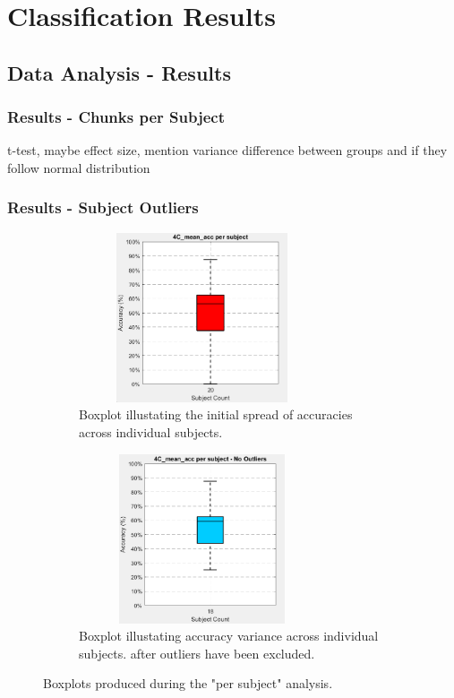 \pagebreak
\chapter{Classification Results}
\label{sec:classifier}

\section{Data Analysis - Results}

\subsection{Results - Chunks per Subject}

t-test, maybe effect size, mention variance difference between groups and if they follow normal distribution

\subsection{Results - Subject Outliers}
\label{subs:res_outliers}

\begin{figure}[htbp]
 	\centering
	\begin{subfigure}{0.49\textwidth}
		\centering
		\includegraphics[width = 0.8\textwidth, height = 5cm]{assets/images/per_subj_4C_all.png}
		\caption{Boxplot illustating the initial spread of accuracies across individual subjects.}
		\label{fig:per_subj_all}
	\end{subfigure}
	\hfill
	\begin{subfigure}{0.49\textwidth}
		\centering
	 	\includegraphics[width = 0.8\textwidth, height = 5cm]{assets/images/per_subj_4C_18.png}
		\caption{Boxplot illustating accuracy variance across individual subjects. after outliers have been excluded.}
		\label{fig:per_subj_18}
	\end{subfigure}
	\caption[Boxplots of Individual Subjects' Accuracies]{Boxplots produced during the "per subject" analysis.}
 	\label{fig:per_subj}
\end{figure}

